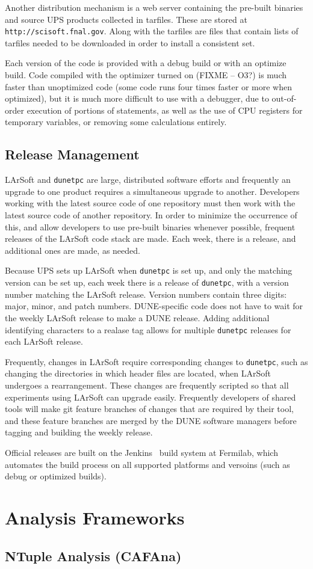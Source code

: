 Another distribution mechanism is a web server containing the pre-built binaries and source UPS products
collected in tarfiles.  These are stored at {\tt http://scisoft.fnal.gov}.  Along with the tarfiles are
files that contain lists of tarfiles needed to be downloaded in order to install a consistent set.

Each version of the code is provided with a debug build or with an optimize build.  Code compiled with
the optimizer turned on (FIXME -- O3?) is much faster than unoptimized code (some code runs four times faster
or more when optimized), but it is much more difficult to use with a debugger, due to out-of-order execution
of portions of statements, as well as the use of CPU registers for temporary variables, or removing some
calculations entirely.

\subsection{Release Management}

LArSoft and {\tt dunetpc} are large, distributed software efforts and frequently an upgrade to one product
requires a simultaneous upgrade to another.  Developers working with the latest source code of one repository
must then work with the latest source code of another repository.  In order to minimize the occurrence of this,
and allow developers to use pre-built binaries whenever possible, frequent releases of the LArSoft code stack
are made.  Each week, there is a release, and additional ones are made, as needed.

Because UPS sets up LArSoft when {\tt dunetpc} is set up, and only the matching version can be set up,
each week there is a release of {\tt dunetpc}, with a version number matching the LArSoft release.  Version
numbers contain three digits: major, minor, and patch numbers.  DUNE-specific code does not have to wait
for the weekly LArSoft release to make a DUNE release.  Adding additional identifying characters to a realase
tag allows for multiple {\tt dunetpc} releases for each LArSoft release.

Frequently, changes in LArSoft require corresponding changes to {\tt dunetpc}, such as changing the directories
in which header files are located, when LArSoft undergoes a rearrangement.  These changes are frequently scripted
so that all experiments using LArSoft can upgrade easily.  Frequently developers of shared tools will make git
feature branches of changes that are required by their tool, and these feature branches are merged by the
DUNE software managers before tagging and building the weekly release.

Official releases are built on the Jenkins~\cite{jenkins} build system at Fermilab, which automates the
build process on all supported platforms and versoins (such as debug or optimized builds).

\section{Analysis Frameworks}
\subsection{NTuple Analysis (CAFAna)}
